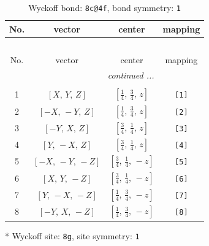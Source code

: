 \documentclass[fleqn,8pt]{jsarticle}
\begin{document}
\renewcommand{\arraystretch}{1.2}
\begin{longtable}{cccc}
\caption{Wyckoff bond: {\tt 8c@4f}, bond symmetry: {\tt 1}}
 \\
 \hline \hline
No. & vector & center & mapping \\ \hline \endfirsthead

\multicolumn{3}{l}{\tablename\ \thetable{}} \\
 \hline \hline
No. & vector & center & mapping \\ \hline \endhead

 \hline \hline
\multicolumn{3}{r}{\footnotesize\it continued ...} \\ \endfoot

 \hline \hline
\multicolumn{3}{r}{} \\ \endlastfoot

1 & $\left[ X,\, Y,\, Z \right]$ & $\left[ \frac{1}{4},\, \frac{3}{4},\, z \right]$ & {\tt [1]} \\ \hline
2 & $\left[ - X,\, - Y,\, Z \right]$ & $\left[ \frac{1}{4},\, \frac{3}{4},\, z \right]$ & {\tt [2]} \\ \hline
3 & $\left[ - Y,\, X,\, Z \right]$ & $\left[ \frac{3}{4},\, \frac{1}{4},\, z \right]$ & {\tt [3]} \\ \hline
4 & $\left[ Y,\, - X,\, Z \right]$ & $\left[ \frac{3}{4},\, \frac{1}{4},\, z \right]$ & {\tt [4]} \\ \hline
5 & $\left[ - X,\, - Y,\, - Z \right]$ & $\left[ \frac{3}{4},\, \frac{1}{4},\, - z \right]$ & {\tt [5]} \\ \hline
6 & $\left[ X,\, Y,\, - Z \right]$ & $\left[ \frac{3}{4},\, \frac{1}{4},\, - z \right]$ & {\tt [6]} \\ \hline
7 & $\left[ Y,\, - X,\, - Z \right]$ & $\left[ \frac{1}{4},\, \frac{3}{4},\, - z \right]$ & {\tt [7]} \\ \hline
8 & $\left[ - Y,\, X,\, - Z \right]$ & $\left[ \frac{1}{4},\, \frac{3}{4},\, - z \right]$ & {\tt [8]} \\
\end{longtable}
* Wyckoff site: {\tt 8g}, site symmetry: {\tt 1}
\renewcommand{\arraystretch}{1.2}
\end{document}
